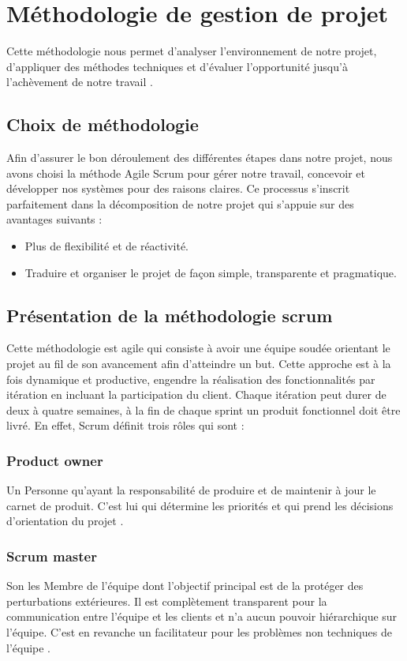 	
	
	\section{Méthodologie de gestion de projet }
	Cette méthodologie nous permet d'analyser l'environnement de notre projet, d'appliquer des méthodes techniques et d'évaluer l'opportunité jusqu'à l'achèvement de notre travail .
	\subsection{Choix de méthodologie }
	Afin d'assurer le bon déroulement des différentes étapes dans notre projet, nous avons choisi la méthode Agile Scrum pour gérer notre travail, concevoir et développer nos systèmes pour des raisons claires. Ce processus  s'inscrit parfaitement dans la décomposition de notre projet qui s'appuie sur des avantages suivants :
	\begin{itemize}
		\item Plus de flexibilité et de réactivité.
		\item Traduire et organiser le projet de façon simple, transparente et pragmatique.
	\end{itemize}
	
	\subsection{Présentation de la méthodologie scrum }
	Cette méthodologie est agile qui consiste à avoir une équipe soudée orientant le projet au fil de son avancement afin d’atteindre un but. Cette approche est à la fois dynamique et productive, engendre la réalisation des fonctionnalités par itération en incluant la participation du client. Chaque itération peut durer de deux à quatre semaines, à la fin de chaque sprint un produit fonctionnel doit être livré. En effet, Scrum définit trois rôles qui sont :
	\subsubsection{Product owner }
	Un Personne qu'ayant la responsabilité de produire et de maintenir à jour le carnet de produit. C'est lui qui détermine les priorités et qui prend les décisions d'orientation du projet .
	\subsubsection{Scrum master  }
	Son les Membre de l'équipe dont l'objectif principal est de la protéger des perturbations extérieures. Il est complètement transparent pour la communication entre l'équipe et les clients et n'a aucun pouvoir hiérarchique sur l'équipe. C'est en revanche un facilitateur pour les problèmes non techniques de l'équipe .
